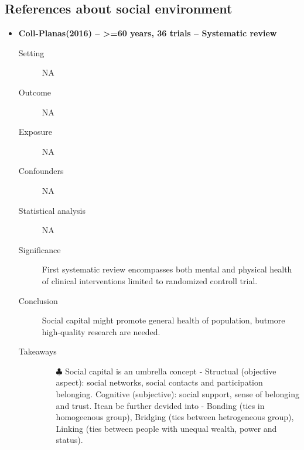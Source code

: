 \documentclass{article}
\begin{document}
\subsection{References about social environment}
\begin{itemize}
\item{\bf Coll-Planas(2016) -- >=60 years, 36 trials  -- Systematic review} 
		\begin{description}
			\item[Setting] NA 
			\item[Outcome] NA 
			\item[Exposure] NA
			\item[Confounders] NA
			\item[Statistical analysis] NA
			\item[Significance] First systematic review encompasses both mental and physical health of clinical interventions limited to randomized controll trial.
			\item[Conclusion] Social capital might promote general health of population, butmore high-quality research are needed.
			\item[Takeaways] \mbox{}\par
				\begin{itemize}
					\item[$\clubsuit$] Social capital is an umbrella concept - Structual (objective aspect): social networks, social contacts and participation belonging. Cognitive (subjective): social support, sense of belonging and trust. Itcan be further devided into - Bonding (ties in homogeenous group), Bridging (ties between hetrogeneous group), Linking (ties between people with unequal wealth, power and status).
				\end{itemize} 
		\end{description}


\end{itemize}
\end{document}
